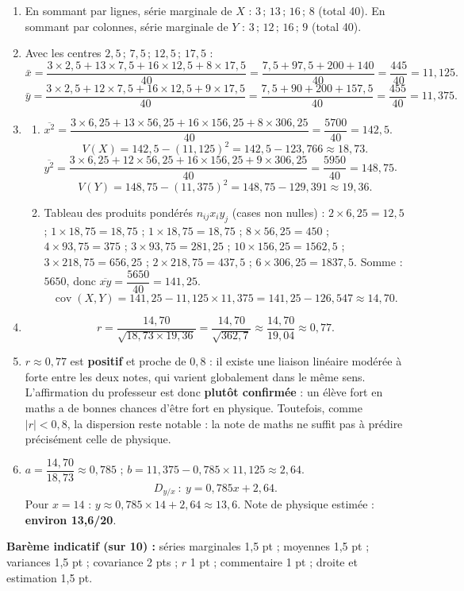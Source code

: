 \documentclass[11pt]{article}
\begin{document}
\begin{corrige}
\begin{enumerate}
\item En sommant par lignes, série marginale de $X$ : $3\,;\,13\,;\,16\,;\,8$ (total 40).
En sommant par colonnes, série marginale de $Y$ : $3\,;\,12\,;\,16\,;\,9$ (total 40).
\item Avec les centres $2{,}5\,;\,7{,}5\,;\,12{,}5\,;\,17{,}5$ :
\[
\bar{x}=\frac{3\times2{,}5+13\times7{,}5+16\times12{,}5+8\times17{,}5}{40}=\frac{7{,}5+97{,}5+200+140}{40}=\frac{445}{40}=11{,}125.
\]
\[
\bar{y}=\frac{3\times2{,}5+12\times7{,}5+16\times12{,}5+9\times17{,}5}{40}=\frac{7{,}5+90+200+157{,}5}{40}=\frac{455}{40}=11{,}375.
\]
\item \begin{enumerate}
\item $\overline{x^2}=\dfrac{3\times6{,}25+13\times56{,}25+16\times156{,}25+8\times306{,}25}{40}=\dfrac{5700}{40}=142{,}5$.
\[
V(X)=142{,}5-(11{,}125)^2=142{,}5-123{,}766\approx18{,}73.
\]
$\overline{y^2}=\dfrac{3\times6{,}25+12\times56{,}25+16\times156{,}25+9\times306{,}25}{40}=\dfrac{5950}{40}=148{,}75$.
\[
V(Y)=148{,}75-(11{,}375)^2=148{,}75-129{,}391\approx19{,}36.
\]
\item Tableau des produits pondérés $n_{ij}x_iy_j$ (cases non nulles) :
$2\times6{,}25=12{,}5$ ; $1\times18{,}75=18{,}75$ ; $1\times18{,}75=18{,}75$ ; $8\times56{,}25=450$ ; $4\times93{,}75=375$ ; $3\times93{,}75=281{,}25$ ; $10\times156{,}25=1562{,}5$ ; $3\times218{,}75=656{,}25$ ; $2\times218{,}75=437{,}5$ ; $6\times306{,}25=1837{,}5$.
Somme : $5650$, donc $\overline{xy}=\dfrac{5650}{40}=141{,}25$.
\[
\operatorname{cov}(X,Y)=141{,}25-11{,}125\times11{,}375=141{,}25-126{,}547\approx14{,}70.
\]
\end{enumerate}
\item \[
r=\frac{14{,}70}{\sqrt{18{,}73\times19{,}36}}=\frac{14{,}70}{\sqrt{362{,}7}}\approx\frac{14{,}70}{19{,}04}\approx0{,}77.
\]
\item $r\approx0{,}77$ est \textbf{positif} et proche de $0{,}8$ : il existe une liaison linéaire modérée à forte entre les deux notes, qui varient globalement dans le même sens. L'affirmation du professeur est donc \textbf{plutôt confirmée} : un élève fort en maths a de bonnes chances d'être fort en physique. Toutefois, comme $|r|<0{,}8$, la dispersion reste notable : la note de maths ne suffit pas à prédire précisément celle de physique.
\item $a=\dfrac{14{,}70}{18{,}73}\approx0{,}785$ ; $b=11{,}375-0{,}785\times11{,}125\approx2{,}64$.
\[
D_{y/x}\ :\ y=0{,}785x+2{,}64.
\]
Pour $x=14$ : $y\approx0{,}785\times14+2{,}64\approx13{,}6$. Note de physique estimée : \textbf{environ 13,6/20}.
\end{enumerate}
\textbf{Barème indicatif (sur 10) :} séries marginales 1,5 pt ; moyennes 1,5 pt ; variances 1,5 pt ; covariance 2 pts ; $r$ 1 pt ; commentaire 1 pt ; droite et estimation 1,5 pt.


\end{corrige}
\end{document}
